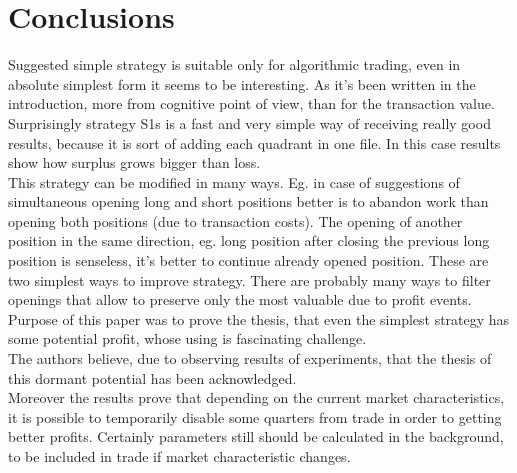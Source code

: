 








\section{Conclusions}
\label{sec:c3Conclusions}
\indent Suggested simple strategy is suitable only for algorithmic trading, even in absolute simplest form it seems to be interesting. As it’s been written in the introduction, more from cognitive point of view, than for the transaction value.\\
\indent Surprisingly strategy S1s is a fast and very simple way of receiving really good results, because it is sort of adding each quadrant in one file. In this case results show how surplus grows bigger than loss. \\
\indent This strategy can be modified in many ways.  Eg. in case of suggestions of simultaneous opening long and short positions better is to abandon work than opening both positions (due to transaction costs). The opening of another position in the same direction, eg. long position after closing the previous long position is senseless, it’s better to continue already opened position. These are two simplest ways to improve strategy. There are probably many ways to filter openings that allow to preserve only the most valuable due to profit events. Purpose of this paper was to prove the thesis, that even the simplest strategy has some potential profit, whose using is fascinating challenge.\\
\indent The authors believe, due to observing results of experiments, that the thesis of this dormant potential has been acknowledged. \\
\indent Moreover the results prove that depending on the current market characteristics, it is possible to temporarily disable some quarters from trade in order to getting better profits. Certainly parameters still should be calculated in the background, to be included in trade if market characteristic changes.





